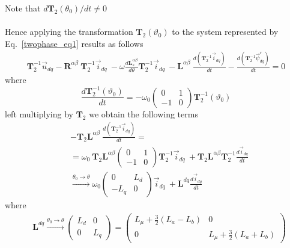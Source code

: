 \documentclass[11pt,a4paper,oneside]{book}
\numberwithin{equation}{section}
\theoremstyle{it}
\theoremstyle{definition}
\begin{document}
Note that $d\mathbf{T}_2(\theta_0)/dt \ne 0$ \\\\
Hence applying the transformation ${\mathbf{T}}_2(\vartheta_0)$ to the system 
represented by Eq.~\eqref{twophase_eq1} results as follows
\begin{equation*}
	\begin{aligned}
		\mathbf{T}_2^{-1}\vec{u}_{dq}-\mathbf{R}^{\alpha\beta}\ 
		\mathbf{T}_2^{-1}\vec{i}_{dq}\ 
		-\omega\frac{d\mathbf{L}_s^{\alpha\beta}}{d\theta}\mathbf{T}_2^{-1}\vec{i}_{dq}\
		-\mathbf{L}^{\alpha\beta}\ \frac{d\left( 
			\mathbf{T}_2^{-1}\vec{i}_{dq}\right) }{dt}-\frac{d\left( 
			\mathbf{T}_2^{-1}\vec{\psi}_{dq}^r\right) }{dt} = 0
	\end{aligned} 
\end{equation*}
where
\begin{equation}
	\frac{d\mathbf{T}_2^{-1}(\vartheta_0)}{dt}= -\omega_0\begin{pmatrix} 0 & 
		1\\ -1 & 0 \end{pmatrix}\mathbf{T}_2^{-1}(\vartheta_0)
\end{equation}
left multiplying by $\mathbf{T}_2$ we obtain the following terms
\begin{equation}
	\begin{aligned}
		&-\mathbf{T}_2\mathbf{L}^{\alpha\beta}\ \frac{d\left( 
			\mathbf{T}_2^{-1}\vec{i}_{dq}\right) }{dt} = \\[6pt]
		&=\omega_0\ \mathbf{T}_2\mathbf{L}^{\alpha\beta}\begin{pmatrix} 0 & 1\\ 
			-1 & 0 \end{pmatrix}\mathbf{T}_2^{-1}\vec{i}_{dq}\ + 
		\mathbf{T}_2\mathbf{L}^{\alpha\beta}\mathbf{T}_2^{-1}\frac{d\vec{i}_{dq}}{dt}
		\\[6pt]
		&\xrightarrow{\theta_0\rightarrow\theta} \omega_0\begin{pmatrix} 0 & 
			L_d\\ -L_q & 0 \end{pmatrix}\vec{i}_{dq}\ + 
		\mathbf{L}^{dq}\frac{d\vec{i}_{dq}}{dt}
	\end{aligned}
\end{equation}
where 
\begin{equation}
	\begin{aligned}
		&\mathbf{L}^{dq} \xrightarrow{\theta_0\rightarrow\theta} 
		\begin{pmatrix} L_d & 0\\ 0 & L_q \end{pmatrix} = \begin{pmatrix} 
			L_{\mu}+\frac{3}{2}(L_a-L_b) & 0\\ 0 & L_{\mu}+\frac{3}{2}(L_a+L_b) 
		\end{pmatrix}
	\end{aligned}
\end{equation}
\end{document}
